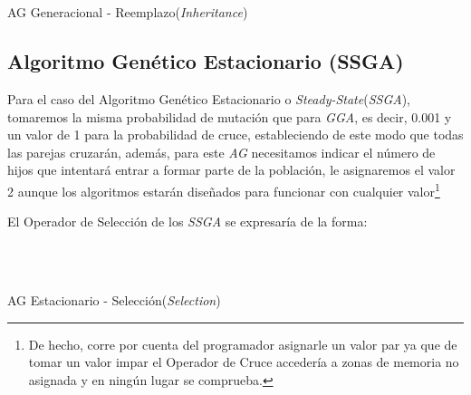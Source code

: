 \documentclass[a4paper, 11pt]{article}
\begin{document}
			\begin{algorithm}[H]
				\begin{algorithmic}[1]
				\REQUIRE \ \\
						 \
						
					\ENDIF
				\ENDFOR
				
				
					\ENDIF
				\ENDFOR
				\end{algorithmic}
			\caption{AG Generacional - Reemplazo(\textit{Inheritance})}
			\label{GGA-Inher}
			\end{algorithm}
			
		\subsection{Algoritmo Genético Estacionario (\textbf{SSGA})}
			Para el caso del Algoritmo Genético Estacionario o \textit{Steady-State}(\textit{SSGA}),
			tomaremos la misma probabilidad de mutación que para \textit{GGA}, es decir, 0.001 y un
			valor de 1 para la probabilidad de cruce, estableciendo de este modo que todas las parejas
			cruzarán, además, para este \textit{AG} necesitamos indicar el número de hijos que intentará
			entrar a formar parte de la población, le asignaremos el valor 2 aunque los algoritmos
			estarán diseñados para funcionar con cualquier valor\footnote{De hecho, corre por cuenta
			del programador asignarle un valor par ya que de tomar un valor impar el Operador de Cruce
			accedería a zonas de memoria no asignada y en ningún lugar se comprueba.}
			
			El Operador de Selección de los \textit{SSGA} se expresaría de la forma:
			
			\begin{algorithm}[H]
				\begin{algorithmic}[1]
				\REQUIRE \ \\
						 \
				
					\ENDIF
				\ENDWHILE
				
				\end{algorithmic}
			\caption{AG Estacionario - Selección(\textit{Selection})}
			\label{SSGA-Selec}
			\end{algorithm}
			
\end{document}
